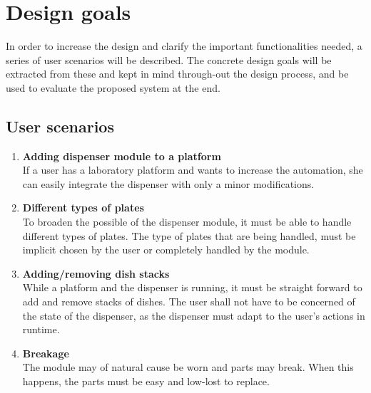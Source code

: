 \documentclass{sigchi}
\begin{document}
	
	
	
	
	
	\section{Design goals}
	In order to increase the design and clarify the important functionalities needed, a series of user scenarios will be described. The concrete design goals will be extracted from these and kept in mind through-out the design process, and be used to evaluate the proposed system at the end.
	
	\subsection{User scenarios}
	
	\begin{enumerate}
		\item \textbf{Adding dispenser module to a platform}\\
		If a user has a laboratory platform and wants to increase the automation, she can easily integrate the dispenser with only a minor modifications.
		
		\item \textbf{Different types of plates}\\
		To broaden the possible of the dispenser module, it must be able to handle different types of plates. The type of plates that are being handled, must be implicit chosen by the user or completely handled by the module.
		
		\item \textbf{Adding/removing dish stacks}\\
		While a platform and the dispenser is running, it must be straight forward to add and remove stacks of dishes. The user shall not have to be concerned of the state of the dispenser, as the dispenser must adapt to the user's actions in runtime.
		
		\item \textbf{Breakage}\\
		The module may of natural cause be worn and parts may break. When this happens, the parts must be easy and low-lost to replace.
		
	\end{enumerate}
	
\end{document}

